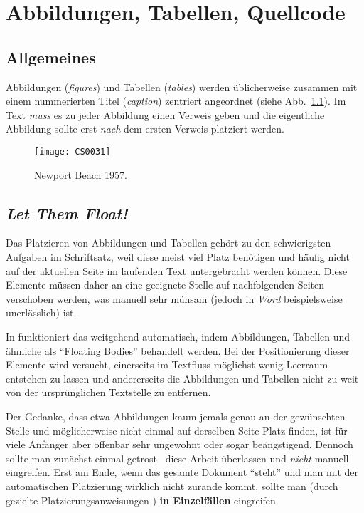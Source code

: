 \chapter{Abbildungen, Tabellen, Quellcode}
\label{chap:Abbildungen}

\section{Allgemeines}

Abbildungen (\emph{figures}) und Tabellen (\emph{tables}) werden üblicherweise
zusammen mit einem nummerierten Titel (\emph{caption}) zentriert
angeordnet (siehe Abb.~\ref{fig:urlaub}).
Im Text \emph{muss} es zu jeder Abbildung einen Verweis geben und die eigentliche Abbildung
sollte erst \emph{nach} dem ersten Verweis platziert werden.

\begin{figure}
\centering
\texttt{[image: CS0031]}
\caption{Newport Beach 1957.}
\label{fig:urlaub}
\end{figure}



\section{\emph{Let Them Float!}}

Das Platzieren von Abbildungen und Tabellen gehört zu den
schwierigsten Aufgaben im Schriftsatz, weil diese meist viel Platz
benötigen und häufig nicht auf der aktuellen Seite im laufenden
Text untergebracht werden können. Diese Elemente müssen daher an
eine geeignete Stelle auf nachfolgenden Seiten verschoben werden,
was manuell sehr mühsam (jedoch in \emph{Word} beispielsweise unerlässlich) ist.

In \latex funktioniert das weitgehend automatisch, indem
Abbildungen, Tabellen und ähnliche als "`Floating Bodies"'
behandelt werden. Bei der Positionierung dieser Elemente wird
versucht, einerseits im Textfluss möglichst wenig Leer\-raum
entstehen zu lassen und andererseits die Abbildungen und Tabellen
nicht zu weit von der ursprünglichen Textstelle zu entfernen.

Der Gedanke, dass etwa Abbildungen kaum jemals genau an der
ge\-wünsch\-ten Stelle und möglicherweise nicht einmal auf
derselben Seite Platz finden, ist für viele Anfänger aber offenbar sehr
ungewohnt oder sogar beängstigend. Dennoch sollte man zunächst einmal
getrost \latex\ diese Arbeit überlassen und \emph{nicht} manuell
eingreifen. Erst am Ende, wenn das gesamte Dokument "`steht"' und
man mit der automatischen Platzierung wirklich nicht zurande
kommt, sollte man (durch gezielte Platzierungsanweisungen
\cite[S.~33]{Oetiker01}) \textbf{in Einzelfällen} eingreifen.



